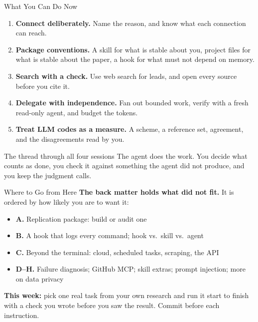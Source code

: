 \documentclass[aspectratio=169, 11pt]{beamer}
\begin{document}
\begin{frame}{What You Can Do Now}
  \begin{enumerate}
    \item \textbf{Connect deliberately.} Name the reason, and know what each connection can reach.
    \item \textbf{Package conventions.} A skill for what is stable about you, project files for what is stable about the paper, a hook for what must not depend on memory.
    \item \textbf{Search with a check.} Use web search for leads, and open every source before you cite it.
    \item \textbf{Delegate with independence.} Fan out bounded work, verify with a fresh read-only agent, and budget the tokens.
    \item \textbf{Treat LLM codes as a measure.} A scheme, a reference set, agreement, and the disagreements read by you.
  \end{enumerate}

  \vspace{0.6em}
  \begin{block}{The thread through all four sessions}
    The agent does the work. You decide what counts as done, you check it against something the agent did not produce, and you keep the judgment calls.
  \end{block}
\end{frame}

\begin{frame}{Where to Go from Here}
  \textbf{The back matter holds what did not fit.} It is ordered by how likely you are to want it:

  \vspace{0.4em}
  \begin{itemize}\small
    \item \textbf{A.} Replication package: build or audit one
    \item \textbf{B.} A hook that logs every command; hook vs.\ skill vs.\ agent
    \item \textbf{C.} Beyond the terminal: cloud, scheduled tasks, scraping, the API
    \item \textbf{D--H.} Failure diagnosis; GitHub MCP; skill extras; prompt injection; more on data privacy
  \end{itemize}

  \vspace{0.6em}
  \textbf{This week:} pick one real task from your own research and run it start to finish with a check you wrote before you saw the result. Commit before each instruction.

  \vspace{0.4em}
  \hyperlink{backmatter}{}
\end{frame}
\end{document}
